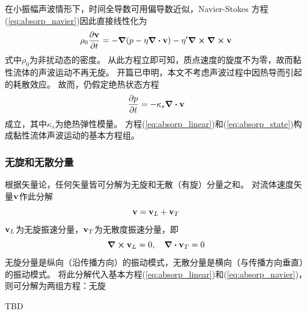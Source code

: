 \documentclass[UTF8]{ctexbook}
\begin{document}
在小振幅声波情形下，时间全导数可用偏导数近似，Navier-Stokes 方程(\ref{eq:absorp_navier})因此直接线性化为
\begin{align}
	\rho_0 \pdv{\vb{v}}{t} = -\grad (p-\eta \div \vb{v}) - \eta' \curl\curl \vb{v}
	\label{eq:absorp_linear}
\end{align}
式中$\rho_0$为非扰动态的密度。
从此方程立即可知，质点速度的旋度不为零，故而黏性流体的声波运动不再无旋。
开篇已申明，本文不考虑声波过程中因热导而引起的耗散效应。
故而，仍假定绝热状态方程
\begin{align}
	\pdv{p}{t} = -\kappa_s \div \vb{v}
	\label{eq:absorp_state}
\end{align}
成立，其中$\kappa_s$为绝热弹性模量。
方程(\ref{eq:absorp_linear})和(\ref{eq:absorp_state})构成黏性流体声波运动的基本方程组。

\subsubsection{无旋和无散分量}
根据矢量论，任何矢量皆可分解为无旋和无散（有旋）分量之和。
对流体速度矢量$\vb{v}$作此分解
$$\vb{v} = \vb{v}_L + \vb{v}_T$$
$\vb{v}_L$为无旋振速分量，$\vb{v}_T$为无散度振速分量，即
$$\curl \vb{v}_L = 0\qc \div \vb{v}_T = 0$$
无旋分量是纵向（沿传播方向）的振动模式，无散分量是横向（与传播方向垂直）的振动模式。
将此分解代入基本方程(\ref{eq:absorp_linear})和(\ref{eq:absorp_navier})，则可分解为两组方程：无旋

TBD
\end{document}
